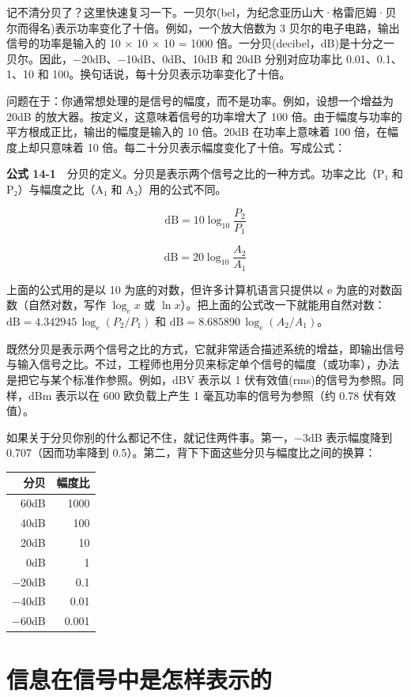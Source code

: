 记不清分贝了？这里快速复习一下。一贝尔(bel，为纪念亚历山大·格雷厄姆·贝尔而得名)表示功率变化了十倍。例如，一个放大倍数为
3 贝尔的电子电路，输出信号的功率是输入的 10 × 10 × 10 = 1000
倍。一分贝(decibel，dB)是十分之一贝尔。因此，−20dB、−10dB、0dB、10dB 和
20dB 分别对应功率比 0.01、0.1、1、10 和
100。换句话说，每十分贝表示功率变化了十倍。

问题在于：你通常想处理的是信号的幅度，而不是功率。例如，设想一个增益为
20dB 的放大器。按定义，这意味着信号的功率增大了 100
倍。由于幅度与功率的平方根成正比，输出的幅度是输入的 10 倍。20dB
在功率上意味着 100 倍，在幅度上却只意味着 10
倍。每二十分贝表示幅度变化了十倍。写成公式：

\textbf{公式
14-1}　分贝的定义。分贝是表示两个信号之比的一种方式。功率之比（P₁ 和
P₂）与幅度之比（A₁ 和 A₂）用的公式不同。

\[\text{dB} = 10\log_{10}\frac{P_2}{P_1}\]

\[\text{dB} = 20\log_{10}\frac{A_2}{A_1}\]

上面的公式用的是以 10 为底的对数，但许多计算机语言只提供以 e
为底的对数函数（自然对数，写作 \(\log_e x\) 或
\(\ln x\)）。把上面的公式改一下就能用自然对数：\(\text{dB} = 4.342945\,\log_e(P_2/P_1)\)
和 \(\text{dB} = 8.685890\,\log_e(A_2/A_1)\)。

既然分贝是表示两个信号之比的方式，它就非常适合描述系统的增益，即输出信号与输入信号之比。不过，工程师也用分贝来标定单个信号的幅度（或功率），办法是把它与某个标准作参照。例如，dBV
表示以 1 伏有效值(rms)的信号为参照。同样，dBm 表示以在 600 欧负载上产生
1 毫瓦功率的信号为参照（约 0.78 伏有效值）。

如果关于分贝你别的什么都记不住，就记住两件事。第一，−3dB 表示幅度降到
0.707（因而功率降到 0.5）。第二，背下下面这些分贝与幅度比之间的换算：

{\def\LTcaptype{none} %
\begin{longtable}[]{@{}rr@{}}
\toprule\noalign{}
分贝 & 幅度比 \\
\midrule\noalign{}
\endhead
\bottomrule\noalign{}
\endlastfoot
60dB & 1000 \\
40dB & 100 \\
20dB & 10 \\
0dB & 1 \\
−20dB & 0.1 \\
−40dB & 0.01 \\
−60dB & 0.001 \\
\end{longtable}
}

\section{信息在信号中是怎样表示的}


